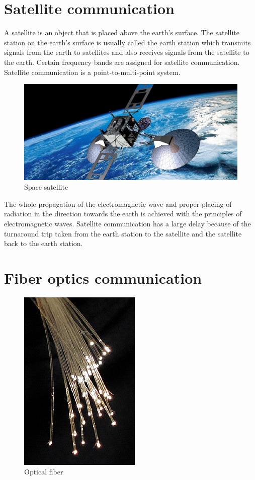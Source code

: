 \section{Satellite communication}
A satellite is an object that is placed above the earth's surface. The satellite station on the earth's surface is usually called the earth station which transmits signals from the earth to satellites and also receives signals from the satellite to the earth. Certain frequency bands are assigned for satellite communication. Satellite communication is a point-to-multi-point system.
\begin{figure}[h]
\centering
\includegraphics[scale=0.2]{./graphics/satellite}
\caption{Space satellite}
\end{figure}

The whole propagation of the electromagnetic wave and proper placing of radiation in the direction towards the earth is achieved with the principles of electromagnetic waves. Satellite communication has a large delay because of the turnaround trip taken from the earth station to the satellite and the satellite back to the earth station.

\section{Fiber optics communication}
\begin{figure}[h]
\centering
\includegraphics[scale=0.4]{./graphics/opticalfiber1}
\caption{Optical fiber}
\end{figure}

